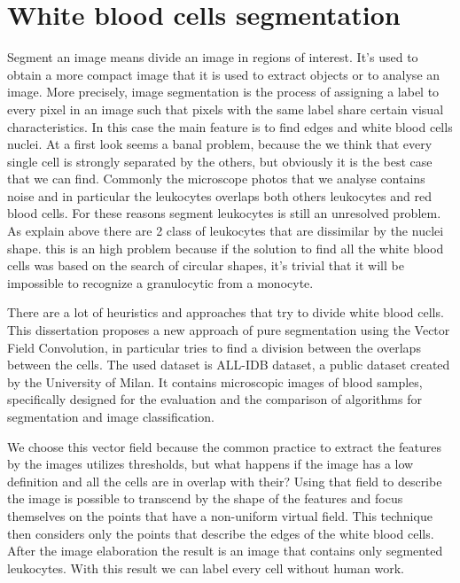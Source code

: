 \section*{White blood cells segmentation}
Segment an image means divide an image in regions of interest. It's used to obtain a more compact image that it is used to extract objects or to analyse an image. More precisely, image segmentation is the process of assigning a label to every pixel in an image such that pixels with the same label share certain visual characteristics. In this case the main feature is to find edges and white blood cells nuclei. At a first look seems a banal problem, because the we think that every single cell is strongly separated by the others, but obviously it is the best case that we can find. Commonly the microscope photos that we analyse contains noise and in particular the leukocytes overlaps both others leukocytes and red blood cells. For these reasons segment leukocytes is still an unresolved problem. As explain above there are 2 class of leukocytes that are dissimilar by the nuclei shape. this is an high problem because if the solution to find all the white blood cells was based on the search of circular shapes, it's trivial that it will be impossible to recognize a granulocytic from a monocyte.


\bigskip


There are a lot of heuristics and approaches that try to divide white blood cells. This dissertation proposes a new approach of pure segmentation using the Vector Field Convolution, in particular tries to find a division between the overlaps between the cells. The used dataset is ALL-IDB dataset, a public dataset created by the University of Milan. It contains microscopic images of blood samples, specifically designed for the evaluation and the comparison of algorithms for segmentation and image classification.


\bigskip 


We choose this vector field because the common practice to extract the features by the images utilizes thresholds, but what happens if the image has a low definition and all the cells are in overlap with their? Using that field to describe the image is possible to transcend by the shape of the features and focus themselves on the points that have a non-uniform virtual field. This technique then considers only the points that describe the edges of the white blood cells. After the image elaboration the result is an image that contains only segmented leukocytes. With this result we can label every cell without human work.


